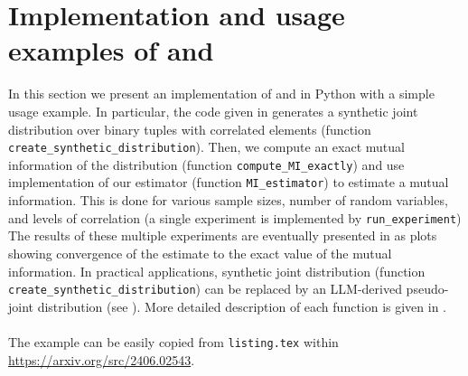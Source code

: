 %
\section{Implementation and usage examples of  and }
\label{sec:listing}
%


In this section we present an implementation of  and  in Python with a simple usage example.
In particular, the code given in  generates a synthetic joint distribution over binary tuples with correlated elements (function \verb!create_synthetic_distribution!).
Then, we compute an exact mutual information of the distribution (function \verb!compute_MI_exactly!) and use implementation of our estimator (function \verb!MI_estimator!) to estimate a mutual information.
This is done for various sample sizes, number of random variables, and levels of correlation (a single experiment is implemented by \verb!run_experiment!)
The results of these multiple experiments are eventually presented in as plots showing convergence of the estimate to the exact value of the mutual information.
In practical applications, synthetic joint distribution (function \verb!create_synthetic_distribution!) can be replaced by an LLM-derived pseudo-joint distribution (see ).
More detailed description of each function is given in .
~\\~\\
The example can be easily copied from \verb!listing.tex! within \url{https://arxiv.org/src/2406.02543}.
%       
